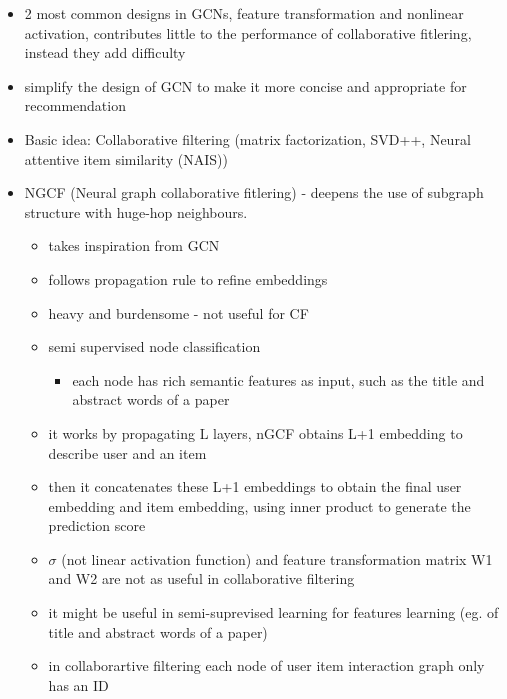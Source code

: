 \documentclass{report}
\begin{document}
\begin{itemize}
    \item 2 most common designs in GCNs, feature transformation and nonlinear activation, contributes little to the performance of collaborative fitlering, instead they add difficulty
    \item simplify the design of GCN to make it more concise and appropriate for recommendation 
    \item Basic idea: Collaborative filtering (matrix factorization, SVD++, Neural attentive item similarity (NAIS))
    \item NGCF (Neural graph collaborative fitlering) - deepens the use of subgraph structure with huge-hop neighbours. 
    \begin{itemize}
        \item takes inspiration from GCN
        \item follows propagation rule to refine embeddings
        \item heavy and burdensome - not useful for CF
        \item semi supervised node classification 
        \begin{itemize}
            \item each node has rich semantic features as input, such as the title and abstract words of a paper
        \end{itemize}
        \item it works by propagating L layers,  nGCF obtains L+1 embedding to describe  user and an item
        \item then it concatenates these L+1 embeddings to obtain the final user embedding and item embedding, using inner product to generate the prediction score
        \item \(\sigma\) (not linear activation function) and feature transformation matrix W1 and W2 are not as useful in collaborative filtering
        \item it might be useful in semi-suprevised learning for features learning (eg. of title and abstract words of a paper)
        \item in collaborartive filtering each node of user item interaction graph only has an ID
       

\end{itemize}
\end{itemize}
\end{document}

